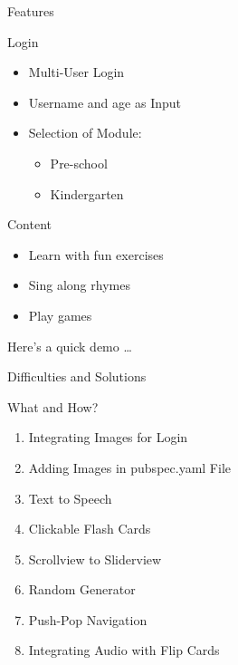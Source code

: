 \documentclass[14pt]{beamer}
\begin{document}
\begin{frame}[standout]
    \alert{Features}
\end{frame}


\begin{frame}{Login}
    \pause
    \begin{itemize}
        \item Multi-User Login
    \pause
        \item Username and age as Input
    \pause
        \item Selection of Module:
    \begin{itemize}
    	\item Pre-school
        \item Kindergarten
    \end{itemize}
    \end{itemize}
\end{frame}


\begin{frame}{Content}
    \begin{itemize}
            \pause
        \item Learn with fun exercises \\
            \pause
        \item Sing along rhymes \\
            \pause
        \item Play games \\
    \end{itemize}
\end{frame}


\begin{frame}[standout]
    \alert{Here's a quick demo \ldots}
\end{frame}


\begin{frame}[standout]
    \alert{Difficulties and Solutions}
\end{frame}


\begin{frame} {What and How?}
    \begin{enumerate}
        \item Integrating Images for Login
    \pause
        \item Adding Images in pubspec.yaml File
    \pause
        \item Text to Speech
    \pause
        \item Clickable Flash Cards
    \pause
        \item Scrollview to Sliderview
    \pause
        \item Random Generator
    \pause
        \item Push-Pop Navigation
    \pause
        \item Integrating Audio with Flip Cards
    \end{enumerate}
\end{frame}
\end{document}
